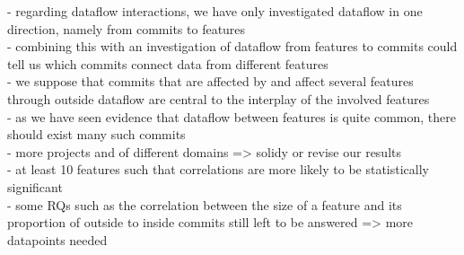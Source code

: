 - regarding dataflow interactions, we have only investigated dataflow in one direction, namely from commits to features \\
- combining this with an investigation of dataflow from features to commits could tell us which commits connect data from different features \\
- we suppose that commits that are affected by and affect several features through outside dataflow are central to the interplay of the involved features \\
- as we have seen evidence that dataflow between features is quite common, there should exist many such commits \\

- more projects and of different domains => solidy or revise our results \\
- at least 10 features such that correlations are more likely to be statistically significant \\
- some RQs such as the correlation between the size of a feature and its proportion of outside to inside commits still left to be answered => more datapoints needed \\



